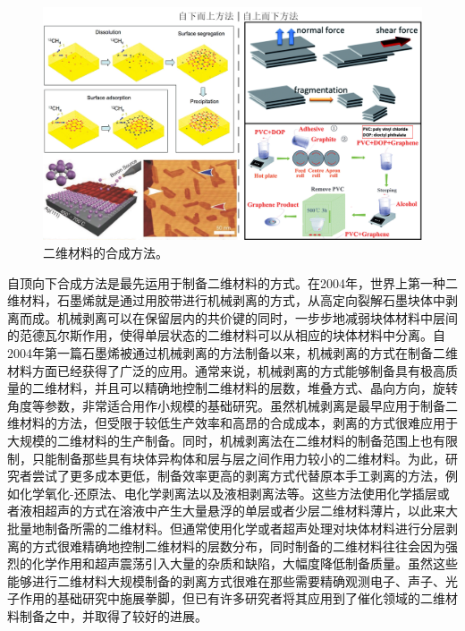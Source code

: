     \begin{figure}[htb]
        \includegraphics{pic/INTRO_growth_upAndDown.png}
        \caption{二维材料的合成方法。}
    \end{figure}

    自顶向下合成方法是最先运用于制备二维材料的方式。在2004年，世界上第一种二维材料，石墨烯就是通过用胶带进行机械剥离的方式，从高定向裂解石墨块体中剥离而成。机械剥离可以在保留层内的共价键的同时，一步步地减弱块体材料中层间的范德瓦尔斯作用，使得单层状态的二维材料可以从相应的块体材料中分离。自2004年第一篇石墨烯被通过机械剥离的方法制备以来，机械剥离的方式在制备二维材料方面已经获得了广泛的应用。通常来说，机械剥离的方式能够制备具有极高质量的二维材料，并且可以精确地控制二维材料的层数，堆叠方式、晶向方向，旋转角度等参数，非常适合用作小规模的基础研究。虽然机械剥离是最早应用于制备二维材料的方法，但受限于较低生产效率和高昂的合成成本，剥离的方式很难应用于大规模的二维材料的生产制备。同时，机械剥离法在二维材料的制备范围上也有限制，只能制备那些具有块体异构体和层与层之间作用力较小的二维材料。为此，研究者尝试了更多成本更低，制备效率更高的剥离方式代替原本手工剥离的方法，例如化学氧化-还原法、电化学剥离法以及液相剥离法等。这些方法使用化学插层或者液相超声的方式在溶液中产生大量悬浮的单层或者少层二维材料薄片，以此来大批量地制备所需的二维材料。但通常使用化学或者超声处理对块体材料进行分层剥离的方式很难精确地控制二维材料的层数分布，同时制备的二维材料往往会因为强烈的化学作用和超声震荡引入大量的杂质和缺陷，大幅度降低制备质量。虽然这些能够进行二维材料大规模制备的剥离方式很难在那些需要精确观测电子、声子、光子作用的基础研究中施展拳脚，但已有许多研究者将其应用到了催化领域的二维材料制备之中，并取得了较好的进展。

